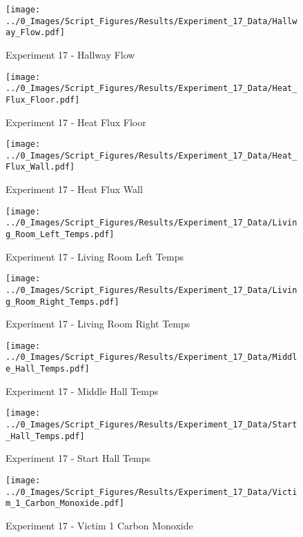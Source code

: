 	\clearpage

	\begin{figure}[H]
		\centering
		\texttt{[image: ../0\_Images/Script\_Figures/Results/Experiment\_17\_Data/Hallway\_Flow.pdf]}
		\caption[]{Experiment 17 - Hallway Flow}
	\end{figure}
 

	\begin{figure}[H]
		\centering
		\texttt{[image: ../0\_Images/Script\_Figures/Results/Experiment\_17\_Data/Heat\_Flux\_Floor.pdf]}
		\caption[]{Experiment 17 - Heat Flux Floor}
	\end{figure}
 
	\clearpage

	\begin{figure}[H]
		\centering
		\texttt{[image: ../0\_Images/Script\_Figures/Results/Experiment\_17\_Data/Heat\_Flux\_Wall.pdf]}
		\caption[]{Experiment 17 - Heat Flux Wall}
	\end{figure}
 

	\begin{figure}[H]
		\centering
		\texttt{[image: ../0\_Images/Script\_Figures/Results/Experiment\_17\_Data/Living\_Room\_Left\_Temps.pdf]}
		\caption[]{Experiment 17 - Living Room Left Temps}
	\end{figure}
 
	\clearpage

	\begin{figure}[H]
		\centering
		\texttt{[image: ../0\_Images/Script\_Figures/Results/Experiment\_17\_Data/Living\_Room\_Right\_Temps.pdf]}
		\caption[]{Experiment 17 - Living Room Right Temps}
	\end{figure}
 

	\begin{figure}[H]
		\centering
		\texttt{[image: ../0\_Images/Script\_Figures/Results/Experiment\_17\_Data/Middle\_Hall\_Temps.pdf]}
		\caption[]{Experiment 17 - Middle Hall Temps}
	\end{figure}
 
	\clearpage

	\begin{figure}[H]
		\centering
		\texttt{[image: ../0\_Images/Script\_Figures/Results/Experiment\_17\_Data/Start\_Hall\_Temps.pdf]}
		\caption[]{Experiment 17 - Start Hall Temps}
	\end{figure}
 

	\begin{figure}[H]
		\centering
		\texttt{[image: ../0\_Images/Script\_Figures/Results/Experiment\_17\_Data/Victim\_1\_Carbon\_Monoxide.pdf]}
		\caption[]{Experiment 17 - Victim 1 Carbon Monoxide}
	\end{figure}
 
